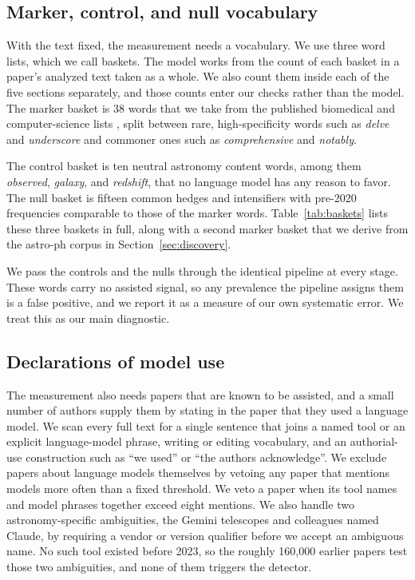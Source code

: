 \documentclass[twocolumn]{aastex631}
\begin{document}
\subsection{Marker, control, and null vocabulary}\label{sec:m-words}

With the text fixed, the measurement needs a vocabulary. We use three word lists, which we call baskets. The model works from the count of each basket in a paper's analyzed text taken as a whole. We also count them inside each of the five sections separately, and those counts enter our checks rather than the model. The marker basket is 38 words that we take from the published biomedical and computer-science lists \citep{Liang2024, Kobak2024, Gray2025}, split between rare, high-specificity words such as \textit{delve} and \textit{underscore} and commoner ones such as \textit{comprehensive} and \textit{notably}.

The control basket is ten neutral astronomy content words, among them \textit{observed}, \textit{galaxy}, and \textit{redshift}, that no language model has any reason to favor. The null basket is fifteen common hedges and intensifiers with pre-2020 frequencies comparable to those of the marker words. Table~\ref{tab:baskets} lists these three baskets in full, along with a second marker basket that we derive from the astro-ph corpus in Section~\ref{sec:discovery}.

We pass the controls and the nulls through the identical pipeline at every stage. These words carry no assisted signal, so any prevalence the pipeline assigns them is a false positive, and we report it as a measure of our own systematic error. We treat this as our main diagnostic.

\subsection{Declarations of model use}\label{sec:m-decl}

The measurement also needs papers that are known to be assisted, and a small number of authors supply them by stating in the paper that they used a language model. We scan every full text for a single sentence that joins a named tool or an explicit language-model phrase, writing or editing vocabulary, and an authorial-use construction such as ``we used'' or ``the authors acknowledge''. We exclude papers about language models themselves by vetoing any paper that mentions models more often than a fixed threshold. We veto a paper when its tool names and model phrases together exceed eight mentions. We also handle two astronomy-specific ambiguities, the Gemini telescopes and colleagues named Claude, by requiring a vendor or version qualifier before we accept an ambiguous name. No such tool existed before 2023, so the roughly 160{,}000 earlier papers test those two ambiguities, and none of them triggers the detector.
\end{document}
